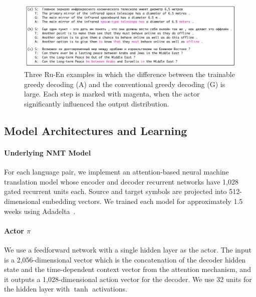 \begin{figure}[t]
\centering
\begin{minipage}{\textwidth}
\includegraphics[width=\columnwidth]{figs/trainable/example.pdf}
\vspace{-5mm}
\caption{\label{fig:exp}   Three Ru-En examples in which the difference between the trainable greedy decoding (A) and the conventional greedy decoding (G) is large. Each step is marked with magenta, when the actor significantly influenced the output distribution.} 
\end{minipage}
\vspace{-2mm}
\end{figure}


\subsection{Model Architectures and Learning}
\paragraph{Underlying NMT Model} 
For each language pair, we implement an attention-based neural machine translation model whose encoder and decoder recurrent networks have 1,028 gated recurrent units \citep[GRU,][]{cho2014learning} each. Source and target symbols are projected into 512-dimensional embedding vectors. We trained each model for approximately 1.5 weeks using Adadelta~\citep{zeiler2012adadelta}.

\paragraph{Actor $\pi$}
We use a feedforward network with a single hidden layer as the actor. The input is a 2,056-dimensional vector which is the concatenation of the decoder hidden state and the time-dependent context vector from the attention mechanism, and it outputs a 1,028-dimensional action vector for the decoder. We use 32 units for the hidden layer with $\tanh$ activations.
 
